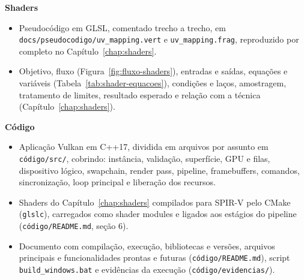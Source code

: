 \documentclass[12pt,a4paper]{report}
\begin{document}
\textbf{Shaders}
\begin{itemize}
    \item[$\boxtimes$] Pseudocódigo em GLSL, comentado trecho a trecho, em \texttt{docs/pseudocodigo/uv\_mapping.vert} e \texttt{uv\_mapping.frag}, reproduzido por completo no Capítulo~\ref{chap:shaders}.
    \item[$\boxtimes$] Objetivo, fluxo (Figura~\ref{fig:fluxo-shaders}), entradas e saídas, equações e variáveis (Tabela~\ref{tab:shader-equacoes}), condições e laços, amostragem, tratamento de limites, resultado esperado e relação com a técnica (Capítulo~\ref{chap:shaders}).
\end{itemize}

\textbf{Código}
\begin{itemize}
    \item[$\boxtimes$] Aplicação Vulkan em C++17, dividida em arquivos por assunto em \texttt{código/src/}, cobrindo: instância, validação, superfície, GPU e filas, dispositivo lógico, swapchain, render pass, pipeline, framebuffers, comandos, sincronização, loop principal e liberação dos recursos.
    \item[$\boxtimes$] Shaders do Capítulo~\ref{chap:shaders} compilados para SPIR-V pelo CMake (\texttt{glslc}), carregados como shader modules e ligados aos estágios do pipeline (\texttt{código/README.md}, seção 6).
    \item[$\boxtimes$] Documento com compilação, execução, bibliotecas e versões, arquivos principais e funcionalidades prontas e futuras (\texttt{código/README.md}), script \texttt{build\_windows.bat} e evidências da execução (\texttt{código/evidencias/}).
\end{itemize}
\end{document}
